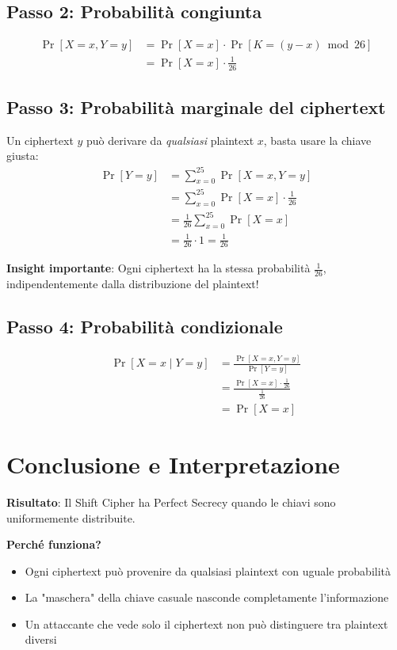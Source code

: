 \subsection{Passo 2: Probabilità congiunta}
\begin{align}
\Pr[X = x, Y = y] &= \Pr[X = x] \cdot \Pr[K = (y-x) \bmod 26] \\
&= \Pr[X = x] \cdot \frac{1}{26}
\end{align}

\subsection{Passo 3: Probabilità marginale del ciphertext}
Un ciphertext $y$ può derivare da \textit{qualsiasi} plaintext $x$, basta usare la chiave giusta:
\begin{align}
\Pr[Y = y] &= \sum_{x=0}^{25} \Pr[X = x, Y = y] \\
&= \sum_{x=0}^{25} \Pr[X = x] \cdot \frac{1}{26} \\
&= \frac{1}{26} \sum_{x=0}^{25} \Pr[X = x] \\
&= \frac{1}{26} \cdot 1 = \frac{1}{26}
\end{align}

\textbf{Insight importante}: Ogni ciphertext ha la stessa probabilità $\frac{1}{26}$, indipendentemente dalla distribuzione del plaintext!

\subsection{Passo 4: Probabilità condizionale}
\begin{align}
\Pr[X = x \mid Y = y] &= \frac{\Pr[X = x, Y = y]}{\Pr[Y = y]} \\
&= \frac{\Pr[X = x] \cdot \frac{1}{26}}{\frac{1}{26}} \\
&= \Pr[X = x]
\end{align}

\section{Conclusione e Interpretazione}

\textbf{Risultato}: Il Shift Cipher ha Perfect Secrecy quando le chiavi sono uniformemente distribuite.

\textbf{Perché funziona?}
\begin{itemize}
    \item Ogni ciphertext può provenire da qualsiasi plaintext con uguale probabilità
    \item La "maschera" della chiave casuale nasconde completamente l'informazione
    \item Un attaccante che vede solo il ciphertext non può distinguere tra plaintext diversi
\end{itemize}


